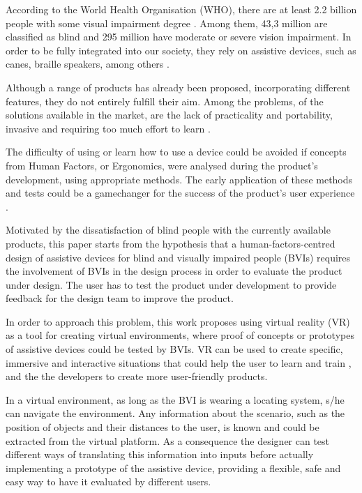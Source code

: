 

According to the World Health Organisation (WHO), there are at least 2.2 billion people with some visual impairment degree \cite{world2019world}. Among them, 43,3 million are classified as blind and 295 million have moderate or severe vision impairment. In order to be fully integrated into our society, they rely on assistive devices, such as canes, braille speakers, among others \cite{bourne2021trends}. 

Although a range of products has already been proposed, incorporating different features, they do not entirely fulfill their aim. Among the problems, of the solutions available in the market, are the lack of practicality and portability, invasive and requiring too much effort to learn \cite{lozano2009electrotactile}.

The difficulty of using or learn how to use a device could be avoided if concepts from Human Factors, or Ergonomics, were analysed during the product’s development, using appropriate methods. The early application of these methods and tests could be a gamechanger for the success of the product's user experience \cite{wolf2019towards}.

Motivated by the dissatisfaction of blind people with the currently available products, this paper starts from the hypothesis that a human-factors-centred design of assistive devices for blind and visually impaired people (BVIs) requires the involvement of BVIs in the design process in order to evaluate the product under design. The user has to test the product under development to provide feedback for the design team to improve the product.

In order to approach this problem, this work proposes using virtual reality (VR) as a tool for creating virtual environments, where proof of concepts or prototypes of assistive devices could be tested by BVIs. VR can be used to create specific, immersive and interactive situations that could help the user to learn and train \cite{farrell2018learning}, and the the developers to create more user-friendly products.

In a virtual environment, as long as the BVI is wearing a locating system, s/he can navigate the environment. Any information about the scenario, such as the position of objects and their distances to the user, is known and could be extracted from the virtual platform. As a consequence the designer can test different ways of translating this information into inputs before actually implementing a prototype of the assistive device, providing a flexible, safe and easy way to have it evaluated by different users.

